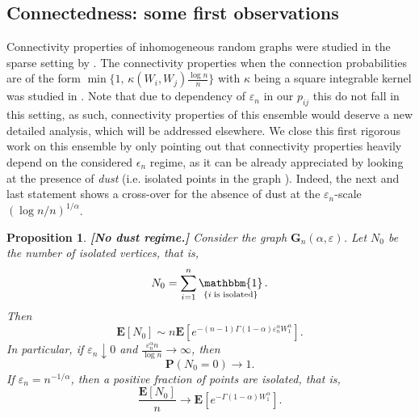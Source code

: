 \documentclass[11pt, reqno]{amsart}
\numberwithin{equation}{section}
\DeclareMathOperator{\one}{\mathbbm{1}} %
\theoremstyle{plain} %
\newtheorem{proposition}[theorem]{Proposition}
\theoremstyle{definition} %
\newtheorem{remark}[theorem]{Remark}
\newcommand{\eps}{\varepsilon}
\newcommand{\prob}{\mathbf{P}}
\newcommand{\E}{\mathbf{E}}
\newcommand{\revise}[1]{{\color{black}#1}}
\begin{document}
\revise{
\subsection{Connectedness: some first observations}
Connectivity properties of inhomogeneous random graphs were studied in the sparse setting by \cite{bollobas2007phase}.  The connectivity properties when the connection probabilities are of the form $\min\{1, \,\kappa(W_i,W_j)\frac{\log n}{n}\}$ with $\kappa$ being a square integrable kernel was studied in \cite{devroye2014connectivity}. Note that due to dependency of $\eps_n$ in our $p_{ij}$ this do not fall in this setting, as such, connectivity properties of this ensemble would deserve a new detailed analysis, which will be addressed elsewhere. We close this first rigorous work on this ensemble by only pointing out that connectivity properties heavily depend on the considered $\epsilon_n$ regime, as it can be already appreciated by looking at the presence 
of \emph{dust} (i.e. isolated points in the graph ). %
Indeed, the next and last statement shows a cross-over for the absence of dust at the $\eps_n$-scale $(\log n/n)^{1/\alpha}$. 

\begin{proposition}\label{Th 3}{\bf[No dust regime.]}
   Consider the graph $\mathbf G_n(\alpha, \eps)$. Let $N_0$ be the number of isolated vertices, that is, 
\begin{equation}\label{Nisolated}
    N_0 = \sum_{i=1}^n \one _{\{i \; \text{is isolated} \}}.
\end{equation}
Then \[
\E[N_0]\sim n\E\left[e^{-(n-1)\Gamma(1-\alpha)\eps_n^\alpha W_1^{\alpha}}\right].
\]
In particular, if $\eps_n\downarrow 0$ and $\frac{\eps_n^{\alpha} n}{\log n}\rightarrow \infty$, then
\begin{equation}\label{noDust}\prob(N_0=0)\to 1.\end{equation}
If $\eps_n= n^{-1/\alpha}$, then a positive fraction of points are isolated, that is,
\[
\frac{\E[N_0]}{n}\rightarrow \E[e^{-\Gamma(1-\alpha) W_1^\alpha}].
\]


\end{proposition}}
\end{document}
